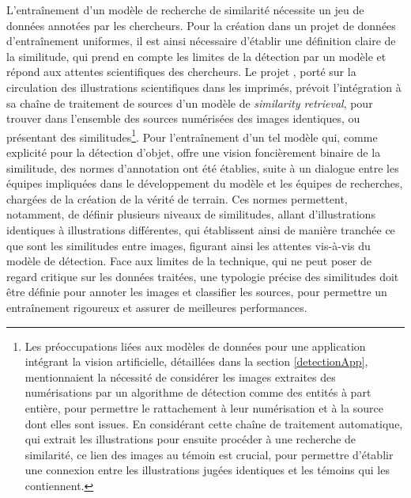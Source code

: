 	L'entraînement d'un modèle de recherche de similarité nécessite un jeu de données annotées par les chercheurs. Pour la création dans un projet de données d'entraînement uniformes, il est ainsi nécessaire d'établir une définition claire de la similitude, qui prend en compte les limites de la détection par un modèle et répond aux attentes scientifiques des chercheurs. Le projet \vhs, porté sur la circulation des illustrations scientifiques dans les imprimés, prévoit l'intégration à sa chaîne de traitement de sources d'un modèle de \textit{similarity retrieval}, pour trouver dans l'ensemble des sources numérisées des images identiques, ou présentant des similitudes\footnote{Les préoccupations liées aux modèles de données pour une application intégrant la vision artificielle, détaillées dans la section \ref{detectionApp}, mentionnaient la nécessité de considérer les images extraites des numérisations par un algorithme de détection comme des entités à part entière, pour permettre le rattachement à leur numérisation et à la source dont elles sont issues. En considérant cette chaîne de traitement automatique, qui extrait les illustrations pour ensuite procéder à une recherche de similarité, ce lien des images au témoin est crucial, pour permettre d'établir une connexion entre les illustrations jugées identiques et les témoins qui les contiennent.}. Pour l'entraînement d'un tel modèle qui, comme explicité pour la détection d'objet, offre une vision foncièrement binaire de la similitude, des normes d'annotation ont été établies, suite à un dialogue entre les équipes impliquées dans le développement du modèle et les équipes de recherches, chargées de la création de la vérité de terrain. Ces normes permettent, notamment, de définir plusieurs niveaux de similitudes, allant d'illustrations identiques à illustrations différentes, qui établissent ainsi de manière tranchée ce que sont les similitudes entre images, figurant ainsi les attentes vis-à-vis du modèle de détection. Face aux limites de la technique, qui ne peut poser de regard critique sur les données traitées, une typologie précise des similitudes doit être définie pour annoter les images et classifier les sources, pour permettre un entraînement rigoureux et assurer de meilleures performances.
	
